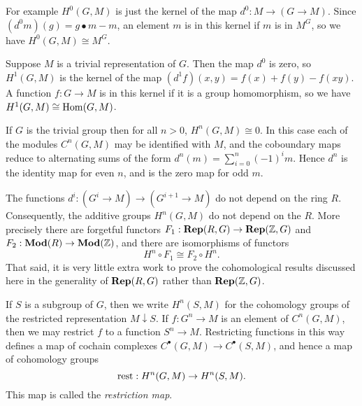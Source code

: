 \begin{example}
	For example $H^0(G,M)$ is just the kernel of the map $d^0 : M \to (G \to M)$.
	Since $(d^0m)(g) = g \bullet m - m$, an element $m$ is in this kernel if $m$ is in $M^G$,
	so we have $H^0(G,M) \cong M^G$.
\end{example}

\begin{example}
	Suppose $M$ is a trivial representation of $G$. Then the map $d^0$ is zero,
	so $H^1(G,M)$ is the kernel of the map $(d^1f)(x,y) = f(x) + f(y) - f(xy)$.
	A function $f: G \to M$ is in this kernel if it is a group homomorphism, so we have
	$H^1(G,M) \cong \mathrm{Hom}(G,M)$.
\end{example}

\begin{example}
	If $G$ is the trivial group then for all $n>0$, $H^n(G,M)\cong 0$.
	In this case each of the modules $C^n(G,M)$ may be identified with $M$,
	and the coboundary maps reduce to alternating sums of the form
	$d^n(m) = \sum_{i=0}^n (-1)^i m$.
	Hence $d^n$ is the identity map for even $n$, and is the zero map for odd $m$.
\end{example}

\begin{remark}
	The functions $d^i : (G^i \to M) \to (G^{i+1} \to M)$ do not depend on the
	ring $R$. Consequently, the additive groups $H^n(G,M)$ do not depend on
	the $R$. More precisely there are forgetful functors $F_1 : \mathbf{Rep}(R,G) \to \mathbf{Rep}({\mathbb Z},G)$
	and $F_2 : \mathbf{Mod}(R) \to \mathbf{Mod}({\mathbb Z})$, and there are isomorphisms of functors
	\[
		H^n \circ F_1 \cong F_2 \circ H^n.
	\]
	That said, it is very little extra work to prove the cohomological results
	discussed here in the generality of $\mathbf{Rep}(R,G)$ rather than $\mathbf{Rep}({\mathbb Z},G)$.
\end{remark}

\begin{definition} \label{def:restriction map}
	If $S$ is a subgroup of $G$, then we write $H^n(S,M)$ for the
	cohomology groups of the restricted representation $M \downarrow S$.
	If $f : G^n \to M$ is an element of $C^n(G,M)$, then we may restrict $f$ to
	a function $S^n \to M$. Restricting functions in this way defines a map of
	cochain complexes $C^\bullet(G,M) \to C^\bullet(S,M)$, and hence a map of
	cohomology groups
	\[
		\mathrm{rest} : H^n(G,M) \to H^n(S,M).
	\]
	This map is called the \emph{restriction map}.
\end{definition}

